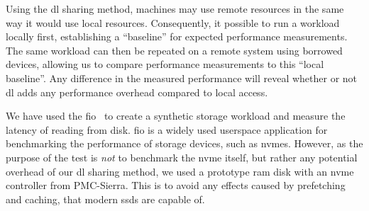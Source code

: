 Using the \gls{dl} sharing method, machines may use remote resources in the same way it would use local resources.
%
Consequently, it possible to run a workload locally first, establishing a ``baseline'' for expected performance measurements.
%
The same workload can then be repeated on a remote system using borrowed devices, allowing us to compare performance measurements to this ``local baseline''.
%
Any difference in the measured performance will reveal whether or not \gls{dl} adds any performance overhead compared to local access.



We have used the \gls{fio}~\cite{url:fio} to create a synthetic storage workload and measure the latency of reading from disk.
%
\Gls{fio} is a widely used \gls{userspace} application for benchmarking the performance of storage devices, such as \glspl{nvme}.
%
However, as the purpose of the test is \emph{not} to benchmark the \gls{nvme} itself, but rather any potential overhead of our \gls{dl} sharing method, we used a prototype \gls{ram} disk with an \gls{nvme} controller from PMC-Sierra.
%
This is to avoid any effects caused by prefetching and caching, that modern \glspl{ssd} are capable of.




